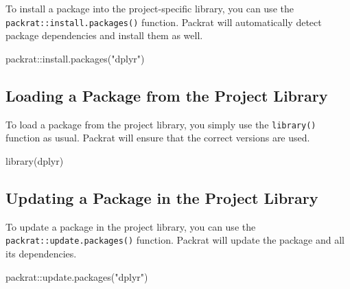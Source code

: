\documentclass[
]{book}
\newenvironment{Shaded}{\begin{snugshade}}{\end{snugshade}}
\newcommand{\FunctionTok}[1]{\textcolor[rgb]{0.00,0.00,0.00}{#1}}
\newcommand{\NormalTok}[1]{#1}
\newcommand{\SpecialCharTok}[1]{\textcolor[rgb]{0.00,0.00,0.00}{#1}}
\newcommand{\StringTok}[1]{\textcolor[rgb]{0.31,0.60,0.02}{#1}}
\begin{document}
To install a package into the project-specific library, you can use the \texttt{packrat::install.packages()} function. Packrat will automatically detect package dependencies and install them as well.

\begin{Shaded}
\begin{Highlighting}[]
\NormalTok{packrat}\SpecialCharTok{::}\FunctionTok{install.packages}\NormalTok{(}\StringTok{"dplyr"}\NormalTok{)}
\end{Highlighting}
\end{Shaded}

\hypertarget{loading-a-package-from-the-project-library}{%
\subsection*{Loading a Package from the Project Library}\label{loading-a-package-from-the-project-library}}

To load a package from the project library, you simply use the \texttt{library()} function as usual. Packrat will ensure that the correct versions are used.

\begin{Shaded}
\begin{Highlighting}[]
\FunctionTok{library}\NormalTok{(dplyr)}
\end{Highlighting}
\end{Shaded}

\hypertarget{updating-a-package-in-the-project-library}{%
\subsection*{Updating a Package in the Project Library}\label{updating-a-package-in-the-project-library}}

To update a package in the project library, you can use the \texttt{packrat::update.packages()} function. Packrat will update the package and all its dependencies.

\begin{Shaded}
\begin{Highlighting}[]
\NormalTok{packrat}\SpecialCharTok{::}\FunctionTok{update.packages}\NormalTok{(}\StringTok{"dplyr"}\NormalTok{)}
\end{Highlighting}
\end{Shaded}
\end{document}
